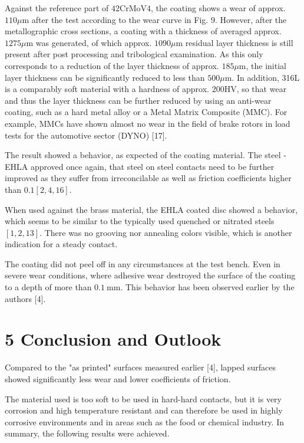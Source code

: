 \documentclass[10pt]{article}
\begin{document}
Against the reference part of $42 \mathrm{CrMoV} 4$, the coating shows a wear of approx. $110 \mu \mathrm{m}$ after the test according to the wear curve in Fig. 9. However, after the metallographic cross sections, a coating with a thickness of averaged approx. $1275 \mu \mathrm{m}$ was generated, of which approx. $1090 \mu \mathrm{m}$ residual layer thickness is still present after post processing and tribological examination. As this only corresponds to a reduction of the layer thickness of approx. $185 \mu \mathrm{m}$, the initial layer thickness can be significantly reduced to less than $500 \mu \mathrm{m}$. In addition, 316L is a comparably soft material with a hardness of approx. $200 \mathrm{HV}$, so that wear and thus the layer thickness can be further reduced by using an anti-wear coating, such as a hard metal alloy or a Metal Matrix Composite (MMC). For example, MMCs have shown almost no wear in the field of brake rotors in load tests for the automotive sector (DYNO) [17].

The result showed a behavior, as expected of the coating material. The steel - EHLA approved once again, that steel on steel contacts need to be further improved as they suffer from irreconcilable as well as friction coefficients higher than $0.1[2,4,16]$.

When used against the brass material, the EHLA coated disc showed a behavior, which seems to be similar to the typically used quenched or nitrated steels $[1,2,13]$. There was no grooving nor annealing colors visible, which is another indication for a steady contact.

The coating did not peel off in any circumstances at the test bench. Even in severe wear conditions, where adhesive wear destroyed the surface of the coating to a depth of more than $0.1 \mathrm{~mm}$. This behavior has been observed earlier by the authors [4].

\section*{5 Conclusion and Outlook}
Compared to the "as printed" surfaces measured earlier [4], lapped surfaces showed significantly less wear and lower coefficients of friction.

The material used is too soft to be used in hard-hard contacts, but it is very corrosion and high temperature resistant and can therefore be used in highly corrosive environments and in areas such as the food or chemical industry. In summary, the following results were achieved.
\end{document}
